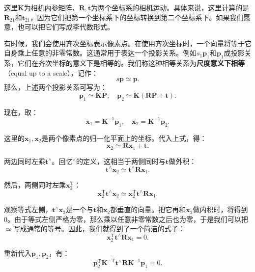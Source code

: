 这里$\bm{K}$为相机内参矩阵，$\bm{R}, \bm{t}$为两个坐标系的相机运动。具体来说，这里计算的是$\bm{R}_{21}$和$\bm{t}_{21}$，因为它们把第一个坐标系下的坐标转换到第二个坐标系下。如果我们愿意，也可以把它们写成李代数形式。

有时候，我们会使用齐次坐标表示像素点。在使用齐次坐标时，一个向量将等于它自身乘上任意的非零常数。这通常用于表达一个投影关系。例如$s_1 \bm{p}_1$和$\bm{p}_1$成投影关系，它们在齐次坐标的意义下是相等的。我们称这种相等关系为\textbf{尺度意义下相等}（equal up to a scale），记作：
\begin{equation}
s\bm{p} \simeq \bm{p}.
\end{equation}
那么，上述两个投影关系可写为：
\begin{equation}
 {\bm{p}_1} \simeq \bm{KP},\quad \bm{p}_2 \simeq \bm{K}\left( \bm{RP + t} \right).
\end{equation}

现在，取：
\begin{equation}
{\bm{x}_1} = {\bm{K}^{ - 1}}{\bm{p}_1}, \quad {\bm{x}_2} = {\bm{K}^{ - 1}}{\bm{p}_2}.
\end{equation}

这里的$\bm{x}_1, \bm{x}_2$是两个像素点的归一化平面上的坐标。代入上式，得：
\begin{equation}
{\bm{x}_2} \simeq \bm{R} {\bm{x}_1} + \bm{t}.
\end{equation}

两边同时左乘$\bm{t}^\wedge$。回忆$^\wedge$的定义，这相当于两侧同时与$\bm{t}$做外积：
\begin{equation}
\bm{t}^\wedge \bm{x}_2 \simeq \bm{t}^\wedge \bm{R} \bm{x}_1.
\end{equation}

然后，两侧同时左乘$\bm{x}_2^\mathrm{T}$：
\begin{equation}
\bm{x}_2^\mathrm{T} \bm{t}^\wedge \bm{x}_2 \simeq \bm{x}_2^\mathrm{T} \bm{t}^\wedge \bm{R} \bm{x}_1.
\end{equation}

观察等式左侧，$\bm{t}^\wedge \bm{x}_2$是一个与$\bm{t}$和$\bm{x}_2$都垂直的向量。把它再和$\bm{x}_2$做内积时，将得到0。由于等式左侧严格为零，那么乘以任意非零常数之后也为零，于是我们可以把$\simeq$写成通常的等号。因此，我们就得到了一个简洁的式子：
\begin{equation}
 \bm{x}_2^\mathrm{T} \bm{t}^\wedge \bm{R} \bm{x}_1 = 0.
\end{equation}

重新代入$\bm{p}_1, \bm{p}_2$，有：
\begin{equation}
\bm{p}_2^\mathrm{T} \bm{K}^{-\mathrm{T}} \bm{t}^\wedge \bm{R} \bm{K}^{-1} \bm{p}_1  = 0.
\end{equation}

